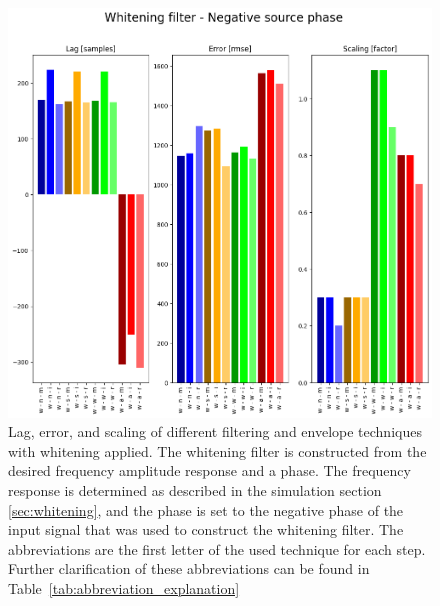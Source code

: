 \begin{figure}[h!t]
	\begin{center}
		\includegraphics[width=1.0\columnwidth]{images/result_whitening_negative_sourcephase.png}
	\end{center}
	\caption{Lag, error, and scaling of different filtering and envelope techniques with whitening applied. The whitening filter is constructed from the desired frequency amplitude response and a phase. The frequency response is determined as described in the simulation section \ref{sec:whitening}, and the phase is set to the negative phase of the input signal that was used to construct the whitening filter. The abbreviations are the first letter of the used technique for each step. Further clarification of these abbreviations can be found in Table~\ref{tab:abbreviation_explanation}}
	\label{fig:result_whitening_negative_sourcephase}
\end{figure}

